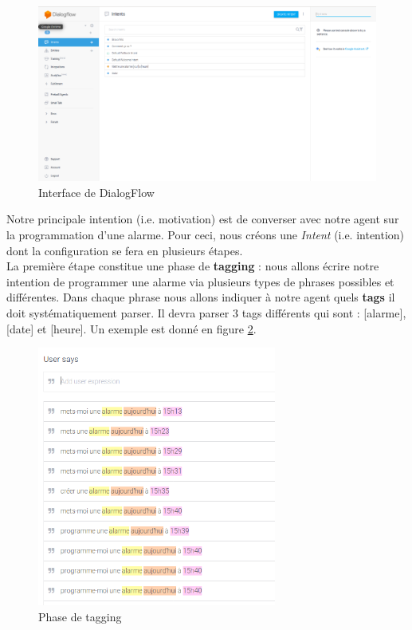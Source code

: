 \begin{figure}[H]
    \centering
        \centering
        \includegraphics[width=1\textwidth]{images/dialogflow.png}
        \caption{Interface de DialogFlow}
        \label{intents}
\end{figure}

Notre principale intention (i.e. motivation) est de converser avec notre agent sur la programmation d'une alarme. Pour ceci, nous créons une \emph{Intent} (i.e. intention) dont 
la configuration se fera en plusieurs étapes.\\

La première étape constitue une phase de \textbf{tagging} : nous allons écrire notre intention de programmer une alarme via plusieurs types de phrases possibles et différentes.
Dans chaque phrase nous allons indiquer à notre agent quels \textbf{tags} il doit systématiquement parser. Il devra parser 3 tags différents qui sont : [alarme], [date] et 
[heure]. Un exemple est donné en figure \ref{tagging}.

\begin{figure}[H]
    \centering
        \centering
        \includegraphics[width=0.7\textwidth]{images/intents.png}
        \caption{Phase de tagging}
        \label{tagging}
\end{figure}

